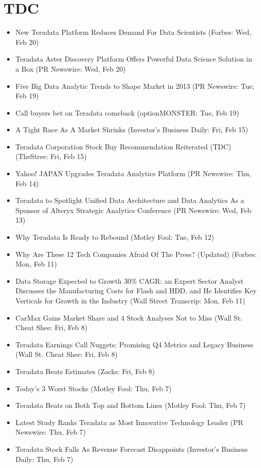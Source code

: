 \documentclass[11pt,asymmetric]{article}
\begin{document}
\section*{TDC}
\begin{itemize}
\item New Teradata Platform Reduces Demand For Data Scientists (Forbes: Wed, Feb 20)
\item Teradata Aster Discovery Platform Offers Powerful Data Science Solution in a Box (PR Newswire: Wed, Feb 20)
\item Five Big Data Analytic Trends to Shape Market in 2013 (PR Newswire: Tue, Feb 19)
\item Call buyers bet on Teradata comeback (optionMONSTER: Tue, Feb 19)
\item A Tight Race As A Market Shrinks (Investor's Business Daily: Fri, Feb 15)
\item Teradata Corporation Stock Buy Recommendation Reiterated (TDC) (TheStree: Fri, Feb 15)
\item Yahoo! JAPAN Upgrades Teradata Analytics Platform (PR Newswire: Thu, Feb 14)
\item Teradata to Spotlight Unified Data Architecture and Data Analytics As a Sponsor of Alteryx Strategic Analytics Conference (PR Newswire: Wed, Feb 13)
\item Why Teradata Is Ready to Rebound (Motley Fool: Tue, Feb 12)
\item Why Are These 12 Tech Companies Afraid Of The Press? (Updated) (Forbes: Mon, Feb 11)
\item Data Storage Expected to Growth 30\% CAGR: an Expert Sector Analyst Discusses the Manufacturing Costs for Flash and HDD, and He Identifies Key Verticals for Growth in the Industry (Wall Street Transcrip: Mon, Feb 11)
\item CarMax Gains Market Share and 4 Stock Analyses Not to Miss (Wall St. Cheat Shee: Fri, Feb 8)
\item Teradata Earnings Call Nuggets: Promising Q4 Metrics and Legacy Business (Wall St. Cheat Shee: Fri, Feb 8)
\item Teradata Beats Estimates (Zacks: Fri, Feb 8)
\item Today's 3 Worst Stocks (Motley Fool: Thu, Feb 7)
\item Teradata Beats on Both Top and Bottom Lines (Motley Fool: Thu, Feb 7)
\item Latest Study Ranks Teradata as Most Innovative Technology Leader (PR Newswire: Thu, Feb 7)
\item Teradata Stock Falls As Revenue Forecast Disappoints (Investor's Business Daily: Thu, Feb 7)

\end{itemize}
\end{document}
